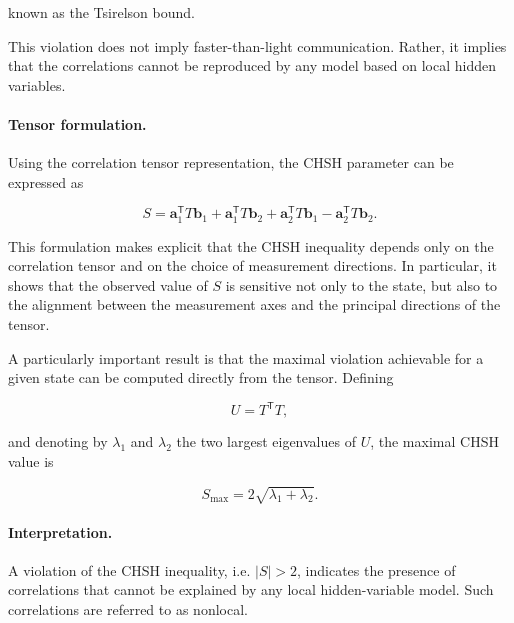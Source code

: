 known as the Tsirelson bound.

This violation does not imply faster-than-light communication. Rather, it implies that the correlations cannot be reproduced by any model based on local hidden variables.

\medskip

\paragraph{Tensor formulation.}

Using the correlation tensor representation, the CHSH parameter can be expressed as

\begin{equation}
S
=
\mathbf{a}_1^{\mathsf T} T \mathbf{b}_1
+
\mathbf{a}_1^{\mathsf T} T \mathbf{b}_2
+
\mathbf{a}_2^{\mathsf T} T \mathbf{b}_1
-
\mathbf{a}_2^{\mathsf T} T \mathbf{b}_2.
\label{eq:chsh_tensor_form}
\end{equation}

This formulation makes explicit that the CHSH inequality depends only on the correlation tensor and on the choice of measurement directions. In particular, it shows that the observed value of \( S \) is sensitive not only to the state, but also to the alignment between the measurement axes and the principal directions of the tensor.

\medskip

A particularly important result is that the maximal violation achievable for a given state can be computed directly from the tensor. Defining

\begin{equation}
U = T^{\mathsf T}T,
\label{eq:horodecki_matrix}
\end{equation}

and denoting by \( \lambda_1 \) and \( \lambda_2 \) the two largest eigenvalues of \( U \), the maximal CHSH value is

\begin{equation}
S_{\max}
=
2\sqrt{\lambda_1+\lambda_2}.
\label{eq:chsh_smax_horodecki}
\end{equation}

\medskip

\paragraph{Interpretation.}

A violation of the CHSH inequality, i.e. \( |S| > 2 \), indicates the presence of correlations that cannot be explained by any local hidden-variable model. Such correlations are referred to as nonlocal.

